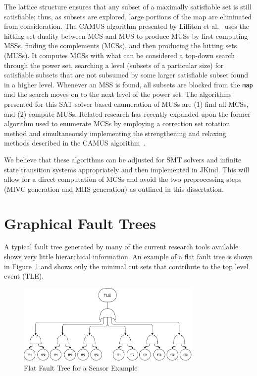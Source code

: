 The lattice structure ensures that any subset of a maximally satisfiable set is still satisfiable; thus, as subsets are explored, large portions of the map are eliminated from consideration. The CAMUS algorithm presented by Liffiton et al.~\cite{liffiton2005finding} uses the hitting set duality between MCS and MUS to produce MUSs by first computing MSSs, finding the complements (MCSs), and then producing the hitting sets (MUSs). It computes MCSs with what can be considered a top-down search through the power set, searching a level (subsets of a particular size) for satisfiable subsets that are not subsumed by some larger satisfiable subset found in a higher level. Whenever an MSS is found, all subsets are blocked from the \texttt{map} and the search moves on to the next level of the power set. The algorithms presented for this SAT-solver based enumeration of MUSs are (1) find all MCSs, and (2) compute MUSs. Related research has recently expanded upon the former algorithm used to enumerate MCSs by employing a correction set rotation method and simultaneously implementing the strengthening and relaxing methods described in the CAMUS algorithm~\cite{narodytska2018core}.  

We believe that these algorithms can be adjusted for SMT solvers and infinite state transition systems appropriately and then implemented in JKind. This will allow for a direct computation of MCSs and avoid the two preprocessing steps (MIVC generation and MHS generation) as outlined in this dissertation. 



\section{Graphical Fault Trees}
A typical fault tree generated by many of the current research tools available shows very little hierarchical information. An example of a flat fault tree is shown in Figure~\ref{fig:flatFT} and shows only the minimal cut sets that contribute to the top level event (TLE). 
\begin{figure}[h!]
	\centering
	\includegraphics[trim=0 0 0 0,clip,width=0.8\textwidth]{images/flatFT.pdf}
	\caption{Flat Fault Tree for a Sensor Example}
	\label{fig:flatFT}
\end{figure}

